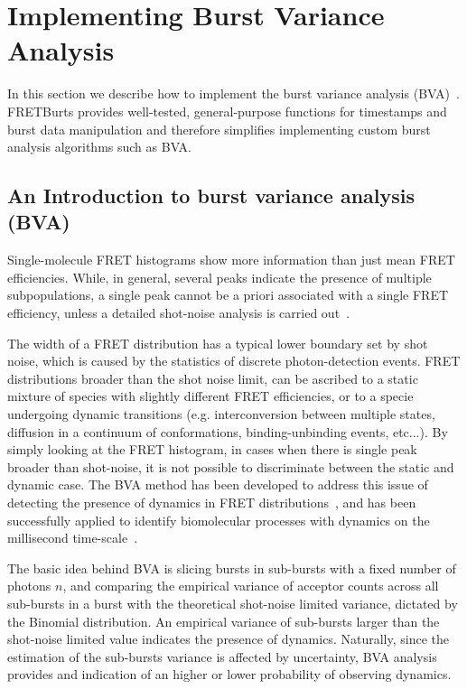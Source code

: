 \section{Implementing Burst Variance Analysis}

\label{sec:bva}
In this section we describe how to implement the burst variance analysis (BVA)~\cite{Torella_2011}.
FRETBurts provides well-tested, general-purpose functions for timestamps and burst data 
manipulation and therefore simplifies implementing custom burst analysis algorithms such as BVA.

\subsection{An Introduction to burst variance analysis (BVA)}
Single-molecule FRET histograms show more information than just mean FRET efficiencies. 
While, in general, several peaks indicate the presence of multiple subpopulations, 
a single peak cannot be a priori associated with a single FRET efficiency,
unless a detailed shot-noise analysis is carried out~\cite{Nir_2006,Antonik2006}.

The width of a FRET distribution has a typical lower boundary set by shot noise, which is caused by
the statistics of discrete photon-detection events. FRET distributions broader than the shot noise limit, 
can be ascribed to a static mixture of species with slightly different FRET efficiencies, 
or to a specie undergoing dynamic transitions (e.g. interconversion between multiple states,
diffusion in a continuum of conformations, binding-unbinding events, etc...).
By simply looking at the FRET histogram,  in cases when there is single peak broader than shot-noise, 
it is not possible to discriminate between the static and dynamic case.
The BVA method has been developed to address this issue of detecting the presence of dynamics 
in FRET distributions~\cite{Torella_2011}, 
and has been successfully applied to identify biomolecular processes with 
dynamics on the millisecond time-scale~\cite{Torella_2011, Robb_2013}.

The basic idea behind BVA is slicing bursts in sub-bursts with a fixed number of photons $n$,
and comparing the empirical variance of acceptor counts across all sub-bursts in a burst 
with the theoretical shot-noise limited variance, dictated by the Binomial distribution.
An empirical variance of sub-bursts larger than the shot-noise limited value indicates
the presence of dynamics. Naturally, since the estimation of the sub-bursts variance is affected
by uncertainty, BVA analysis provides and indication of an higher or lower probability
of observing dynamics.

